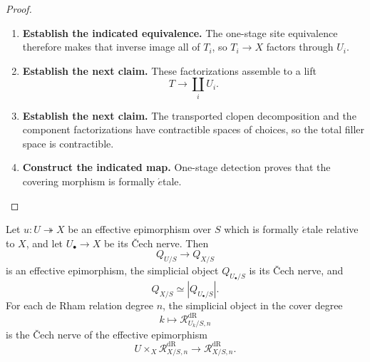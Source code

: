 \begin{proof}
\begin{enumerate}[label=\textup{(\arabic*)}]
    For each \(i\), the inverse image of \(U_i\) in \(T_i\) is an open subobject
    whose pullback to \(V_i\) is all of \(V_i\).
    \item \textbf{Establish the indicated equivalence.}
    The one-stage site equivalence
    therefore makes that inverse image all of \(T_i\), so \(T_i\to X\) factors
    through \(U_i\).
    \item \textbf{Establish the next claim.}
    These factorizations assemble to a lift
    \[
    T\longrightarrow\coprod_iU_i.
    \]
    \item \textbf{Establish the next claim.}
    The transported clopen decomposition and the component factorizations have
    contractible spaces of choices, so the total filler space is contractible.
    \item \textbf{Construct the indicated map.}
    One-stage detection proves that the covering morphism is formally
    \(\acute{e}\)tale.
\end{enumerate}
\end{proof}

\begin{theorem}
\label{thm:effective-formally-etale-quotient-descent}
Let \(u:U\twoheadrightarrow X\) be an effective epimorphism over \(S\) which is
formally \(\acute{e}\)tale relative to \(X\), and let \(U_\bullet\to X\) be its
\v{C}ech nerve. Then
\[
  Q_{U/S}\longrightarrow Q_{X/S}
\]
is an effective epimorphism, the simplicial object \(Q_{U_\bullet/S}\) is its
\v{C}ech nerve, and
\[
  Q_{X/S}
  \simeq
  |Q_{U_\bullet/S}|.
\]
For each de Rham relation degree \(n\), the simplicial object in the cover degree
\[
  k\longmapsto \mathcal R^{\mathrm{dR}}_{U_k/S,n}
\]
is the \v{C}ech nerve of the effective epimorphism
\[
  U\times_X\mathcal R^{\mathrm{dR}}_{X/S,n}
  \longrightarrow
  \mathcal R^{\mathrm{dR}}_{X/S,n}.
\]
\end{theorem}

